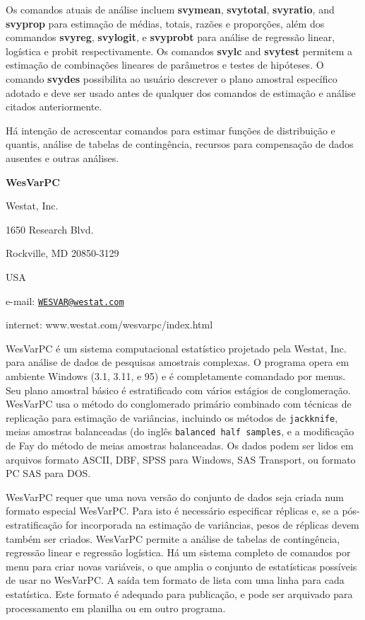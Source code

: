 \documentclass[]{book}
\theoremstyle{definition}
\theoremstyle{definition}
\theoremstyle{definition}
\theoremstyle{remark}
\begin{document}
Os comandos atuais de análise incluem \textbf{svymean},
\textbf{svytotal}, \textbf{svyratio}, and \textbf{svyprop} para
estimação de médias, totais, razões e proporções, além dos commandos
\textbf{svyreg}, \textbf{svylogit}, e \textbf{svyprobt} para análise de
regressão linear, logística e probit respectivamente. Os comandos
\textbf{svylc} and \textbf{svytest} permitem a estimação de combinações
lineares de parâmetros e testes de hipóteses. O comando \textbf{svydes}
possibilita ao usuário descrever o plano amostral específico adotado e
deve ser usado antes de qualquer dos comandos de estimação e análise
citados anteriormente.

Há intenção de acrescentar comandos para estimar funções de distribuição
e quantis, análise de tabelas de contingência, recursos para compensação
de dados ausentes e outras análises.

\textbf{WesVarPC}

Westat, Inc.

1650 Research Blvd.

Rockville, MD 20850-3129

USA

e-mail: \href{mailto:WESVAR@westat.com}{\nolinkurl{WESVAR@westat.com}}

internet: www.westat.com/wesvarpc/index.html

WesVarPC é um sistema computacional estatístico projetado pela Westat,
Inc. para análise de dados de pesquisas amostrais complexas. O programa
opera em ambiente Windows (3.1, 3.11, e 95) e é completamente comandado
por menus. Seu plano amostral básico é estratificado com vários estágios
de conglomeração. WesVarPC usa o método do conglomerado primário
combinado com técnicas de replicação para estimação de variâncias,
incluindo os métodos de \texttt{jackknife}, meias amostras balanceadas
(do inglês \texttt{balanced\ half\ samples}, e a modificação de Fay do
método de meias amostras balanceadas. Os dados podem ser lidos em
arquivos formato ASCII, DBF, SPSS para Windows, SAS Transport, ou
formato PC SAS para DOS.

WesVarPC requer que uma nova versão do conjunto de dados seja criada num
formato especial WesVarPC. Para isto é necessário especificar réplicas
e, se a pós-estratificação for incorporada na estimação de variâncias,
pesos de réplicas devem também ser criados. WesVarPC permite a análise
de tabelas de contingência, regressão linear e regressão logística. Há
um sistema completo de comandos por menu para criar novas variáveis, o
que amplia o conjunto de estatísticas possíveis de usar no WesVarPC. A
saída tem formato de lista com uma linha para cada estatística. Este
formato é adequado para publicação, e pode ser arquivado para
processamento em planilha ou em outro programa.
\end{document}
